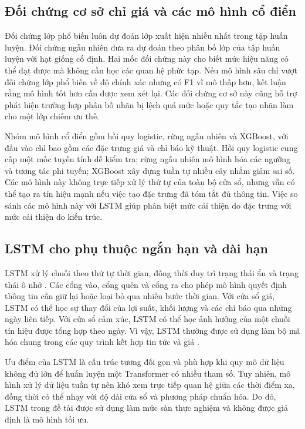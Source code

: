 \documentclass[12pt, a4paper, oneside]{report}
\begin{document}
\subsection{Đối chứng cơ sở chỉ giá và các mô hình cổ điển}

Đối chứng lớp phổ biến luôn dự đoán lớp xuất hiện nhiều nhất trong tập huấn luyện. Đối chứng ngẫu nhiên đưa ra dự đoán theo phân bố lớp của tập huấn luyện với hạt giống cố định. Hai mốc đối chứng này cho biết mức hiệu năng có thể đạt được mà không cần học các quan hệ phức tạp. Nếu mô hình sâu chỉ vượt đối chứng lớp phổ biến về độ chính xác nhưng có F1 vĩ mô thấp hơn, kết luận rằng mô hình tốt hơn cần được xem xét lại. Các đối chứng cơ sở này cũng hỗ trợ phát hiện trường hợp phân bố nhãn bị lệch quá mức hoặc quy tắc tạo nhãn làm cho một lớp chiếm ưu thế.

Nhóm mô hình cổ điển gồm hồi quy logistic, rừng ngẫu nhiên và XGBoost, với đầu vào chỉ bao gồm các đặc trưng giá và chỉ báo kỹ thuật. Hồi quy logistic cung cấp một mốc tuyến tính dễ kiểm tra; rừng ngẫu nhiên mô hình hóa các ngưỡng và tương tác phi tuyến; XGBoost xây dựng tuần tự nhiều cây nhằm giảm sai số. Các mô hình này không trực tiếp xử lý thứ tự của toàn bộ cửa sổ, nhưng vẫn có thể tạo ra tín hiệu mạnh nếu việc tạo đặc trưng đã tóm tắt đủ thông tin. Việc so sánh các mô hình này với LSTM giúp phân biệt mức cải thiện do đặc trưng với mức cải thiện do kiến trúc.

\subsection{LSTM cho phụ thuộc ngắn hạn và dài hạn}

LSTM xử lý chuỗi theo thứ tự thời gian, đồng thời duy trì trạng thái ẩn và trạng thái ô nhớ \cite{Hochreiter1997_lstm}. Các cổng vào, cổng quên và cổng ra cho phép mô hình quyết định thông tin cần giữ lại hoặc loại bỏ qua nhiều bước thời gian. Với cửa sổ giá, LSTM có thể học sự thay đổi của lợi suất, khối lượng và các chỉ báo qua những ngày liên tiếp. Với cửa sổ cảm xúc, LSTM có thể học ảnh hưởng của một chuỗi tín hiệu được tổng hợp theo ngày. Vì vậy, LSTM thường được sử dụng làm bộ mã hóa chung trong các quy trình kết hợp tin tức và giá \cite{Halder2022_221107392v1,Gu2024_240716150v1}.

Ưu điểm của LSTM là cấu trúc tương đối gọn và phù hợp khi quy mô dữ liệu không đủ lớn để huấn luyện một Transformer có nhiều tham số. Tuy nhiên, mô hình xử lý dữ liệu tuần tự nên khó xem trực tiếp quan hệ giữa các thời điểm xa, đồng thời có thể nhạy với độ dài cửa sổ và phương pháp chuẩn hóa. Do đó, LSTM trong đề tài được sử dụng làm mức sàn thực nghiệm và không được giả định là mô hình tối ưu.
\end{document}
